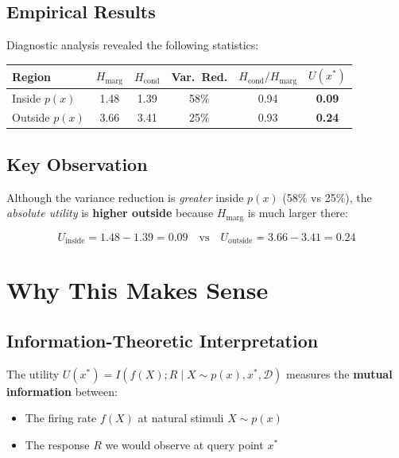 \documentclass[a4paper,11pt]{article}
\newcommand{\Hmarg}{H_{\mathrm{marg}}}
\newcommand{\Hcond}{H_{\mathrm{cond}}}
\newcommand{\D}{\mathcal{D}}
\begin{document}
\subsection{Empirical Results}

Diagnostic analysis revealed the following statistics:

\begin{center}
\begin{tabular}{lccccc}
\toprule
\textbf{Region} & $\Hmarg$ & $\Hcond$ & \textbf{Var.\ Red.} & $\Hcond/\Hmarg$ & $U(x^*)$ \\
\midrule
Inside $p(x)$ & 1.48 & 1.39 & 58\% & 0.94 & \textbf{0.09} \\
Outside $p(x)$ & 3.66 & 3.41 & 25\% & 0.93 & \textbf{0.24} \\
\bottomrule
\end{tabular}
\end{center}

\subsection{Key Observation}

Although the variance reduction is \emph{greater} inside $p(x)$ (58\% vs 25\%), the \emph{absolute utility} is \textbf{higher outside} because $\Hmarg$ is much larger there:

\begin{equation}
U_{\mathrm{inside}} = 1.48 - 1.39 = 0.09 \quad \text{vs} \quad U_{\mathrm{outside}} = 3.66 - 3.41 = 0.24
\end{equation}

\section{Why This Makes Sense}

\subsection{Information-Theoretic Interpretation}

The utility $U(x^*) = I(f(X); R \mid X \sim p(x), x^*, \D)$ measures the \textbf{mutual information} between:
\begin{itemize}
    \item The firing rate $f(X)$ at natural stimuli $X \sim p(x)$
    \item The response $R$ we would observe at query point $x^*$
\end{itemize}
\end{document}
